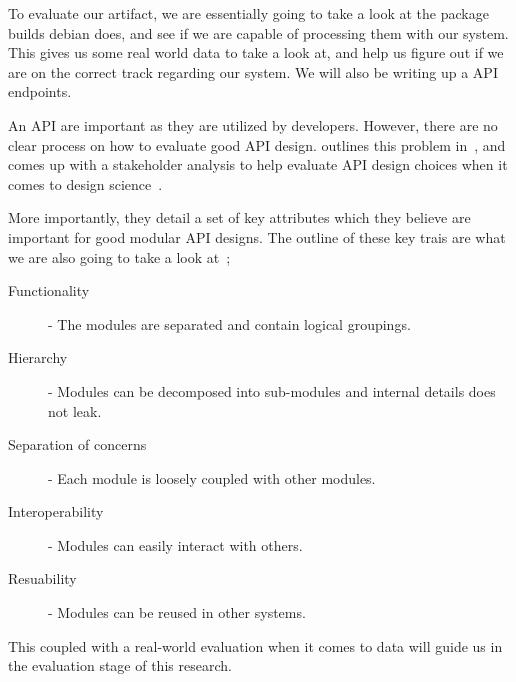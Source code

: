 \documentclass[../Main/thesis.tex]{subfiles}
\begin{document}
To evaluate our artifact, we are essentially going to take a look at the package
builds debian does, and see if we are capable of processing them with our
system. This gives us some real world data to take a look at, and help us figure
out if we are on the correct track regarding our system. We will also be writing
up a API endpoints. 

An API are important as they are utilized by developers. However, there are no
clear process on how to evaluate good API design.
\citeauthor{Iyer:2012:EAC:2342209.2342213} outlines this problem
in~, and comes up with a stakeholder
analysis to help evaluate API design choices when it comes to design
science~\cite{Iyer:2012:EAC:2342209.2342213}.

More importantly, they detail a set of key attributes which they believe are
important for good modular API designs.  
The outline of these key trais are what we are also going to take a look at~\cite[p.~31]{Iyer:2012:EAC:2342209.2342213};
\begin{description}
    \item[Functionality] - The modules are separated and contain logical groupings.
    \item[Hierarchy] - Modules can be decomposed into sub-modules and internal details does not leak.
    \item[Separation of concerns] - Each module is loosely coupled with other modules.
    \item[Interoperability] - Modules can easily interact with others.
    \item[Resuability] - Modules can be reused in other systems.
\end{description}

This coupled with a real-world evaluation when it comes to data will guide us in
the evaluation stage of this research.


\blankpage
\end{document}
